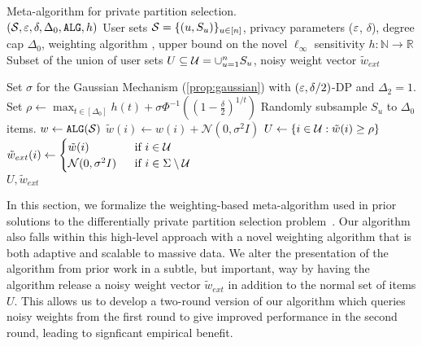 \begin{algorithm}[ht]
\caption{Meta-algorithm for private partition selection.\\
\selectalgo$(\mathcal{S}, \varepsilon, \delta, \Delta_0, \texttt{ALG}, h)$
  User sets $\mathcal{S}=\{(u, S_u)\}_{u\in [n]}$, privacy parameters ($\varepsilon$, $\delta$), degree cap $\Delta_0$, weighting algorithm \weightalgo, upper bound on the novel $\ell_\infty$ sensitivity $h: \mathbb{N} \rightarrow \mathbb{R}$
  Subset of the union of user sets $U \subseteq \mathcal{U} = \cup_{u=1}^n S_u$, noisy weight vector $\tilde{w}_{ext}$
}
\begin{algorithmic}[1]
\label{alg:generic}
    \STATE Set $\sigma$ for the Gaussian Mechanism (\cref{prop:gaussian}) with $(\varepsilon, \delta/2)$-DP and $\Delta_2 = 1$. 
    \STATE Set $\rho \gets \max_{t \in [\Delta_0]} h(t) + \sigma \Phi^{-1}\left(\left(1 - \frac{\delta}{2}\right)^{1/t}\right)$ 
            \STATE Randomly subsample $S_u$ to $\Delta_0$ items. 
        \ENDIF
    \ENDFOR
    \STATE $w \gets \texttt{ALG}(\mathcal{S})$ 
    \STATE $\tilde{w}(i) \gets w(i) + \mathcal{N}(0, \sigma^2 I)$ 
    \STATE $U \gets \{i \in \mathcal{U} : \tilde{w}(i) \geq \rho\}$ 
    \STATE $\tilde{w}_{ext}(i) \gets 
        \begin{cases}
        \tilde{w}(i) \; &\text{ if } i \in \mathcal{U} \\
        \mathcal{N}(0, \sigma^2 I) \; &\text{ if } i \in \Sigma \setminus \mathcal{U}
        \end{cases}$
        \\ 
    \RETURN $U, \tilde{w}_{ext}$ 
\end{algorithmic}
\end{algorithm}


In this section, we formalize the weighting-based meta-algorithm used in prior solutions to the differentially private partition selection problem~\cite{korolova2009releasing, gopi2020dpunion, carvalho2022incorporatingitem, swanberg2023dpsips}. Our algorithm \ouralgo{} also falls within this high-level approach with a novel weighting algorithm that is both adaptive and scalable to massive data.
We alter the presentation of the algorithm from prior work in a subtle, but important, way by having the algorithm release a noisy weight vector $\tilde{w}_{ext}$ in addition to the normal set of items $U$.
This allows us to develop a two-round version of our algorithm \ouralgotworounds{} which queries noisy weights from the first round to give improved performance in the second round, leading to signficant empirical benefit.

